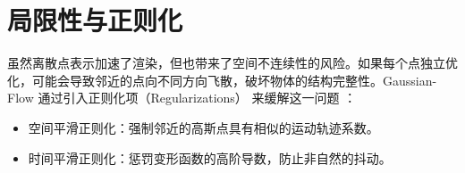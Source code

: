 \section{局限性与正则化}

虽然离散点表示加速了渲染，但也带来了空间不连续性的风险。如果每个点独立优化，可能会导致邻近的点向不同方向飞散，破坏物体的结构完整性。Gaussian-Flow 通过引入正则化项（Regularizations） 来缓解这一问题 \cite{lin2024gaussianflow_cvpr}：
\begin{itemize}
    \item 空间平滑正则化：强制邻近的高斯点具有相似的运动轨迹系数。
    \item 时间平滑正则化：惩罚变形函数的高阶导数，防止非自然的抖动。
\end{itemize}
